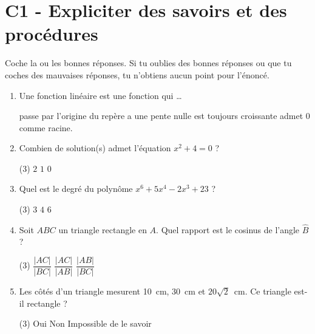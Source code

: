 \documentclass[a4paper, 12pt, parskip=half-]{scrartcl}
\begin{document}
\entete

\section*{C1 - Expliciter des savoirs et des procédures}
\begin{exercise}[points=5]
    Coche la ou les bonnes réponses. Si tu oublies des bonnes réponses ou que tu coches des mauvaises réponses, tu n'obtiens aucun point pour l'énoncé.
    \begin{enumerate}
        \item Une fonction linéaire est une fonction qui \dots
              \begin{QCM}
                  \choice passe par l'origine du repère
                  \choice a une pente nulle
                  \choice est toujours croissante
                  \choice admet $0$ comme racine.
              \end{QCM}
        \item Combien de solution(s) admet l'équation $x^2+4=0$ ?
              \begin{QCM}(3)
                  \choice $2$
                  \choice $1$
                  \choice $0$
              \end{QCM}
        \item Quel est le degré du polynôme $x^6 + 5x^4 -2x^3 +23$ ?
              \begin{QCM}(3)
                  \choice $3$
                  \choice $4$
                  \choice $6$
              \end{QCM}
        \item Soit $ABC$ un triangle rectangle en $A$. Quel rapport est le cosinus de l'angle $\widehat{B}$ ?
              \begin{QCM}(3)
                  \choice $\dfrac{|AC|}{|BC|}$
                  \choice $\dfrac{|AC|}{|AB|}$
                  \choice $\dfrac{|AB|}{|BC|}$
              \end{QCM}
        \item Les côtés d'un triangle mesurent \SI{10}{cm}, \SI{30}{cm} et $20\sqrt{2}$~cm. Ce triangle est-il rectangle ?
              \begin{QCM}(3)
                  \choice Oui
                  \choice Non
                  \choice Impossible de le savoir
              \end{QCM}
    \end{enumerate}
\end{exercise}
\end{document}
